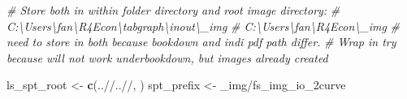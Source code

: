 \documentclass[
]{book}
\newenvironment{Shaded}{\begin{snugshade}}{\end{snugshade}}
\newcommand{\CommentTok}[1]{\textcolor[rgb]{0.56,0.35,0.01}{\textit{#1}}}
\newcommand{\KeywordTok}[1]{\textcolor[rgb]{0.13,0.29,0.53}{\textbf{#1}}}
\newcommand{\NormalTok}[1]{#1}
\newcommand{\StringTok}[1]{\textcolor[rgb]{0.31,0.60,0.02}{#1}}
\begin{document}
\begin{Shaded}
\begin{Highlighting}[]
\CommentTok{\# Store both in within folder directory and root image directory:}
\CommentTok{\# C:\textbackslash{}Users\textbackslash{}fan\textbackslash{}R4Econ\textbackslash{}tabgraph\textbackslash{}inout\textbackslash{}\_img}
\CommentTok{\# C:\textbackslash{}Users\textbackslash{}fan\textbackslash{}R4Econ\textbackslash{}\_img}
\CommentTok{\# need to store in both because bookdown and indi pdf path differ.}
\CommentTok{\# Wrap in try because will not work underbookdown, but images already created}

\NormalTok{ls\_spt\_root \textless{}{-}}\StringTok{ }\KeywordTok{c}\NormalTok{(}\StringTok{\textquotesingle{}..//..//\textquotesingle{}}\NormalTok{, }\StringTok{\textquotesingle{}\textquotesingle{}}\NormalTok{)}
\NormalTok{spt\_prefix \textless{}{-}}\StringTok{ \textquotesingle{}\_img/fs\_img\_io\_2curve\textquotesingle{}}


\end{Highlighting}
\end{Shaded}
\end{document}
